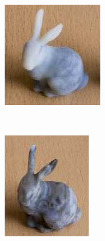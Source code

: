 \documentclass[annual]{acmsiggraph}
\begin{document}
{\begin{subfigure}[b]{0.18\textwidth}
                \caption{}
                \label{teaser:ours}
        \end{subfigure}
        ~
        \begin{subfigure}[b]{0.2\textwidth}
                \centering
    	\includegraphics[width=\textwidth]{figure/bunny_print2.jpg}
                \caption{}
                \label{teaser:makerbot}
        \end{subfigure}
        ~
        \begin{subfigure}[b]{0.18\textwidth}
                \centering
    	\includegraphics[width=\textwidth]{figure/bunny_print3.jpg}

\end{subfigure}}
\end{document}

